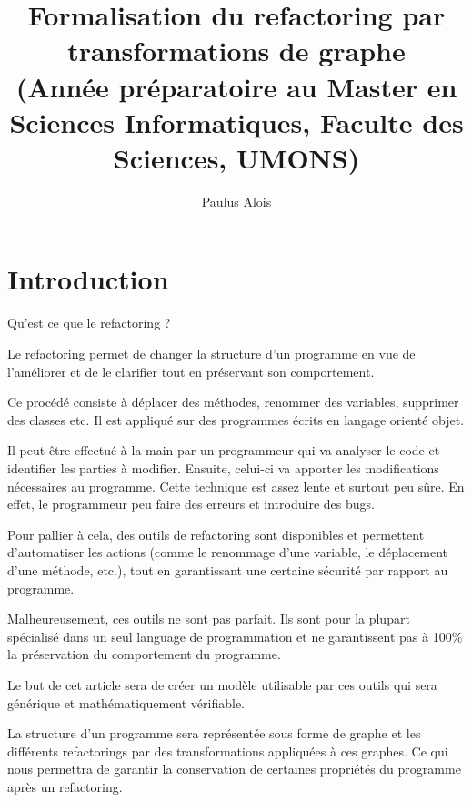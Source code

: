 \documentclass[a4paper, 12pt]{article}
\begin{document}
  \title{Formalisation du refactoring par transformations de graphe \\
  \normalsize {(Année préparatoire au Master en Sciences Informatiques, Faculte des Sciences, UMONS)}}
  \author{Paulus Alois}

  \maketitle

  \newpage

  \tableofcontents

  \newpage

  \section{Introduction}

  Qu'est ce que le refactoring ?

  Le refactoring permet de changer la structure d'un programme en vue de l'améliorer et de le clarifier tout en préservant son comportement.

  Ce procédé consiste à déplacer des méthodes, renommer des variables, supprimer des classes etc. Il est appliqué sur des programmes écrits en langage orienté objet.

  Il peut être effectué à la main par un programmeur qui va analyser le code et identifier les parties à modifier. Ensuite, celui-ci va apporter les modifications nécessaires au programme.
  Cette technique est assez lente et surtout peu sûre. En effet, le programmeur peu faire des erreurs et introduire des bugs.

  Pour pallier à cela, des outils de refactoring sont disponibles et permettent d'automatiser les actions (comme le renommage d'une variable, le déplacement d'une méthode, etc.),
  tout en garantissant une certaine sécurité par rapport au programme.

  Malheureusement, ces outils ne sont pas parfait. Ils sont pour la plupart spécialisé dans un seul language de programmation et ne garantissent pas à 100\% la préservation du comportement du programme.

  Le but de cet article sera de créer un modèle utilisable par ces outils qui sera générique et mathématiquement vérifiable.

  La structure d'un programme sera représentée sous forme de graphe et les différents refactorings par des transformations appliquées à ces graphes.
  Ce qui nous permettra de garantir la conservation de certaines propriétés du programme après un refactoring.
\end{document}
